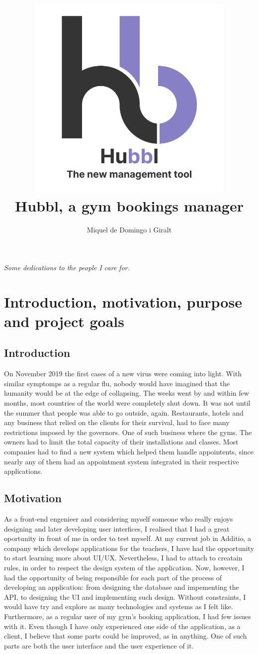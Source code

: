 \documentclass[a4paper, 12pt, oneside]{book}
\title{
	\includegraphics[width=0.75\textwidth]{assets/logo.png}
	\\
	{\huge Hubbl, a gym bookings manager}
}
\author{Miquel de Domingo i Giralt}
\begin{document}
\frontmatter
\maketitle
\newpage\null\thispagestyle{empty}\newpage
\thispagestyle{empty}
\begin{flushright}
	\emph{Some dedications to the people I care for.}
\end{flushright}
\newpage
\thispagestyle{empty}
\tableofcontents
\newpage
\listoffigures
\newpage
\listoftables
\newpage\null\thispagestyle{empty}\newpage
\mainmatter
\chapter{Introduction, motivation, purpose and project goals}
\section{Introduction}
On November 2019 the first cases of a new virus were coming into light. With similar symptomps as a regular flu, nobody would have imagined that the humanity would be at the edge of collapsing. The weeks went by and within few months, most countries of the world were completely shut down. It was not until the summer that people was able to go outside, again. Restaurants, hotels and any business that relied on the clients for their survival, had to face many restrictions imposed by the governors. One of such business where the gyms. The owners had to limit the total capacity of their installations and classes. Most companies had to find a new system which helped them handle appointents, since nearly any of them had an appointment system integrated in their respective applications.
\section{Motivation}
As a front-end engenieer and considering myself someone who really enjoys designing and later developing user interfices, I realised that I had a great oportunity in front of me in order to test myself. At my current job in Additio, a company which develops applications for the teachers, I have had the opportunity to start learning more about UI/UX. Nevertheless, I had to attach to creatain rules, in order to respect the design system of the application. Now, however, I had the opportunity of being responsible for each part of the process of developing an application: from designing the database and impementing the API, to designing the UI and implementing such design. Without constraints, I would have try and explore as many technologies and systems as I felt like.
\\[8pt]
Furthermore, as a regular user of my gym's booking application, I had few issues with it. Even though I have only experienced one side of the application, as a client, I believe that some parts could be improved, as in anything. One of such parts are both the user interface and the user experience of it.
\end{document}
